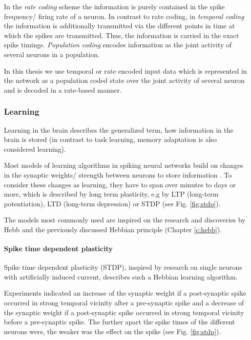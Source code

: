 In the \textit{rate coding} scheme the information is purely contained in the spike frequency/ firing rate of a neuron.
In contrast to rate coding, in \textit{temporal coding} the information is additionally transmitted via the different points in time at which the spikes are transmitted. 
Thus, the information is carried in the exact spike timings.
\textit{Population coding} encodes information as the joint activity of several neurons in a population.  

In this thesis we use temporal or rate encoded input data which is represented in the network as a population coded state over the joint activity of several neuron and is decoded in a rate-based manner. 

\subsubsection{Learning} \label{c:snnlearning}

Learning in the brain describes the generalized term, how information in the brain is stored (in contrast to task learning, memory adaptation is also considered learning).

Most models of learning algorithms in spiking neural networks build on changes in the synaptic weights/ strength between neurons to store information \cite{gerstner2014neuronal}.
To consider these changes as learning, they have to span over minutes to days or more, which is described by long term plasticity, e.g by LTP (long-term potentiation), LTD (long-term depression) or STDP (see Fig. \ref{fig:stdp}).
 
The models most commonly used are inspired on the research and discoveries by Hebb and the previously discussed Hebbian principle (Chapter \ref{c:hebb}).

\paragraph{Spike time dependent plasticity} \label{c:stdp}

Spike time dependent plasticity (STDP), inspired by research on single neurons with artificially induced current, describes such a Hebbian learning algorithm.

Experiments indicated an increase of the synaptic weight if a post-synaptic spike occurred in strong temporal vicinity after a pre-synaptic spike and a decrease of the synaptic weight if a post-synaptic spike occurred in strong temporal vicinity before a pre-synaptic spike.
The further apart the spike times of the different neurons were, the weaker was the effect on the spike (see Fig. \ref{fig:stdp}).

